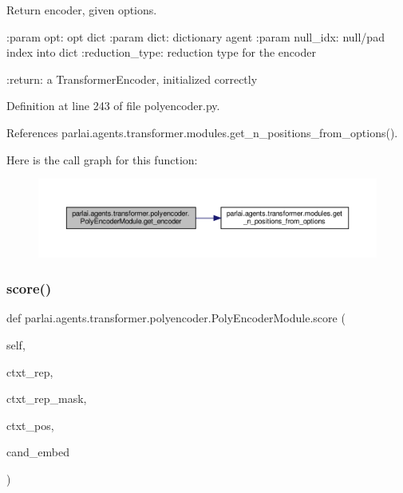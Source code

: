 \begin{DoxyVerb}Return encoder, given options.

:param opt:
    opt dict
:param dict:
    dictionary agent
:param null_idx:
    null/pad index into dict
:reduction_type:
    reduction type for the encoder

:return:
    a TransformerEncoder, initialized correctly
\end{DoxyVerb}
 

Definition at line 243 of file polyencoder.\+py.



References parlai.\+agents.\+transformer.\+modules.\+get\+\_\+n\+\_\+positions\+\_\+from\+\_\+options().

Here is the call graph for this function\+:
\nopagebreak
\begin{figure}[H]
\begin{center}
\leavevmode
\includegraphics[width=350pt]{classparlai_1_1agents_1_1transformer_1_1polyencoder_1_1PolyEncoderModule_acd213717123d2f2f24e6f03270c3db14_cgraph}
\end{center}
\end{figure}
\mbox{\label{classparlai_1_1agents_1_1transformer_1_1polyencoder_1_1PolyEncoderModule_a52218a8c0594ff4d5bf8e666dc38f508}} 
\subsubsection{\texorpdfstring{score()}{score()}}
{\footnotesize\ttfamily def parlai.\+agents.\+transformer.\+polyencoder.\+Poly\+Encoder\+Module.\+score (\begin{DoxyParamCaption}\item[{}]{self,  }\item[{}]{ctxt\+\_\+rep,  }\item[{}]{ctxt\+\_\+rep\+\_\+mask,  }\item[{}]{ctxt\+\_\+pos,  }\item[{}]{cand\+\_\+embed }\end{DoxyParamCaption})}

